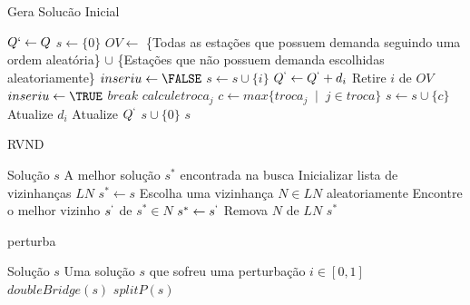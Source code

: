     \begin{algorithm}[H]
    \caption{Gera Solucão Inicial}
    \begin{algorithmic}[1]
    \STATE $Q\lq \leftarrow Q$
    \STATE $s \leftarrow \{0\}$
    \STATE $OV \leftarrow $ \{Todas as estações que possuem demanda seguindo uma ordem aleatória\} $\cup$ \{Estações que não possuem demanda escolhidas aleatoriamente\}
    \REPEAT
        \STATE $inseriu \leftarrow \FALSE$
                \STATE $s \leftarrow s \cup \{i\}$
                \STATE $Q^\lq \leftarrow Q^\lq + d_i$
                \STATE Retire $i$ de $OV$
                \STATE $inseriu \leftarrow \TRUE$
                \STATE $break$
            \ENDIF
        \ENDFOR
                \STATE $calcule troca_j$
            \ENDFOR
            \STATE $c \leftarrow max\{troca_j\; \;|\; \;j \in troca\}$
            \STATE $s \leftarrow s \cup \{c\}$
            \STATE Atualize $d_i$
            \STATE Atualize $Q^\lq$
        \ENDIF
    \STATE $s \cup \{0\}$
    \RETURN $s$
    \end{algorithmic}
    \end{algorithm}
    
    \begin{algorithm}[H]
    \caption{RVND}
    \begin{algorithmic}[1]
    \REQUIRE Solução $s$
    \ENSURE A melhor solução $s^*$ encontrada na busca
    \STATE Inicializar lista de vizinhanças $LN$
    \STATE $s^* \leftarrow s$
        \STATE Escolha uma vizinhança $N \in LN$ aleatoriamente
        \STATE Encontre o melhor vizinho $s^\lq$ de $s^* \in N$
            \STATE $s^* \leftarrow s^\lq$
        \ELSE
            \STATE Remova $N$ de $LN$
        \ENDIF
    \ENDWHILE
    \RETURN $s^*$
    \end{algorithmic}
    \end{algorithm}
    
    \begin{algorithm}[H]
    \caption{perturba}
    \begin{algorithmic}[1]
    \REQUIRE Solução $s$
    \ENSURE Uma solução $s$ que sofreu uma perturbação
    \STATE $i \in [0,1]$
        \RETURN $doubleBridge(s)$
    \ELSE
        \RETURN $splitP(s)$
    \ENDIF
    \end{algorithmic}
    \end{algorithm}